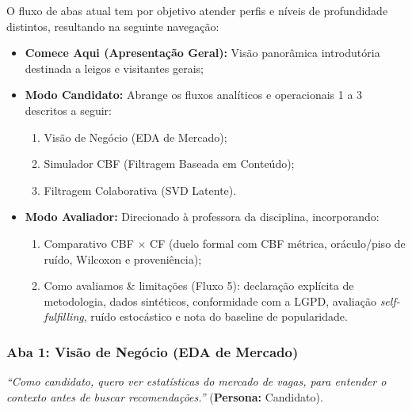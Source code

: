 O fluxo de abas atual tem por objetivo atender perfis e níveis de profundidade distintos, resultando na seguinte navegação:
\begin{itemize}
    \item \textbf{Comece Aqui (Apresentação Geral):} Visão panorâmica introdutória destinada a leigos e visitantes gerais;
    \item \textbf{Modo Candidato:} Abrange os fluxos analíticos e operacionais 1 a 3 descritos a seguir:
    \begin{enumerate}[label=\arabic*.]
        \item Visão de Negócio (EDA de Mercado);
        \item Simulador CBF (Filtragem Baseada em Conteúdo);
        \item Filtragem Colaborativa (SVD Latente).
    \end{enumerate}
    \item \textbf{Modo Avaliador:} Direcionado à professora da disciplina, incorporando:
    \begin{enumerate}[label=\arabic*., start=4]
        \item Comparativo CBF $\times$ CF (duelo formal com CBF métrica, oráculo/piso de ruído, Wilcoxon e proveniência);
        \item Como avaliamos \& limitações (Fluxo 5): declaração explícita de metodologia, dados sintéticos, conformidade com a LGPD, avaliação \textit{self-fulfilling}, ruído estocástico e nota do baseline de popularidade.
    \end{enumerate}
\end{itemize}

\subsubsection{Aba 1: Visão de Negócio (EDA de Mercado)}

\begin{tcolorbox}[userstorybox, title={User Story Vinculada (Aba 1)}]
\textit{``Como candidato, quero ver estatísticas do mercado de vagas, para entender o contexto antes de buscar recomendações.''} (\textbf{Persona:} Candidato).
\end{tcolorbox}

